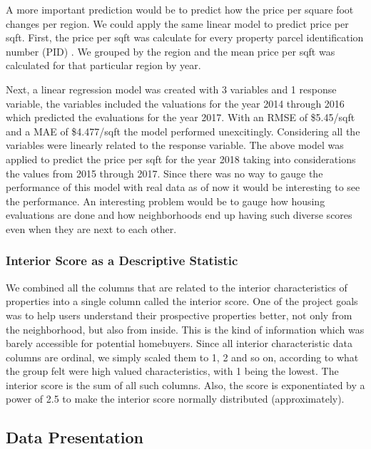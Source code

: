 \documentclass[12pt]{article}
\begin{document}
A more important prediction would be to predict how the price per square 
foot changes per region. We could apply the same linear model to predict 
price per sqft. First, the price per sqft was calculate for every
property parcel identification number (PID) \cite{Property49:online}. We
grouped by the region and the mean price per sqft was calculated for that
particular region by year.

Next, a linear regression model was created with 3 variables and 1 
response variable, the variables included the valuations for the year 
2014 through 2016 which predicted the evaluations for the year 2017. With 
an RMSE of \$5.45/sqft and a MAE of \$4.477/sqft the model performed 
unexcitingly. Considering all the variables were linearly related to the 
response variable. The above model was applied to predict the price per
sqft for the year 2018 taking into considerations the values from 2015
through 2017. Since there was no way to gauge the performance of this
model with real data as of now it would be interesting to see the
performance. An interesting problem would be to gauge how housing 
evaluations are done and how neighborhoods end up having such diverse 
scores even when they are next to each other.

\subsubsection{Interior Score as a Descriptive Statistic}

We combined all the columns that are related to the interior 
characteristics of properties into a single column called the interior 
score. One of the project goals was to help users understand their 
prospective properties better, not only from the neighborhood, but also
from inside. This is the kind of information which was barely accessible
for potential homebuyers. Since all interior characteristic data columns
are ordinal, we simply scaled them to 1, 2 and so on, according to what 
the group felt were high valued characteristics, with 1 being the lowest. The interior score is the sum of all such columns. Also, the score is 
exponentiated by a power of 2.5 to make the interior score normally 
distributed (approximately).


\subsection{Data Presentation}
\end{document}
